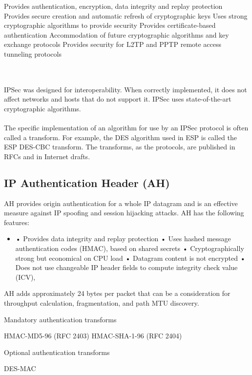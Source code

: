 \documentclass[10pt,a4paper]{article}
\begin{document}
\begin{itemize}
\begin{itemize}
\begin{itemize}
Provides authentication, encryption, data integrity and replay protection
Provides secure creation and automatic refresh of cryptographic keys
Uses strong cryptographic algorithms to provide security
Provides certificate-based authentication
Accommodation of future cryptographic algorithms and key exchange
protocols
Provides security for L2TP and PPTP remote access tunneling protocols
\end{itemize}
\\
\\
IPSec was designed for interoperability. When correctly implemented, it does not
affect networks and hosts that do not support it. IPSec uses state-of-the-art
cryptographic algorithms. 
\\
\\
The specific implementation of an algorithm for use by
an IPSec protocol is often called a transform. For example, the DES algorithm
used in ESP is called the ESP DES-CBC transform. The transforms, as the
protocols, are published in RFCs and in Internet drafts.


\subsection{IP Authentication Header (AH)}

AH provides origin authentication for a whole IP datagram and is an effective
measure against IP spoofing and session hijacking attacks. AH has the following
features:

\begin{itemize}
\item 
• Provides data integrity and replay protection
• Uses hashed message authentication codes (HMAC), based on shared
secrets
• Cryptographically strong but economical on CPU load
• Datagram content is not encrypted
• Does not use changeable IP header fields to compute integrity check value
(ICV),

\end{itemize}

AH adds approximately 24 bytes per packet that can be a consideration for
throughput calculation, fragmentation, and path MTU discovery.


Mandatory authentication transforms
\begin{itemize}
HMAC-MD5-96 (RFC 2403)
HMAC-SHA-1-96 (RFC 2404)
\end{itemize}
Optional authentication transforms
\begin{itemize}
DES-MAC
\end{itemize}



\end{itemize}
\end{itemize}
\end{document}
